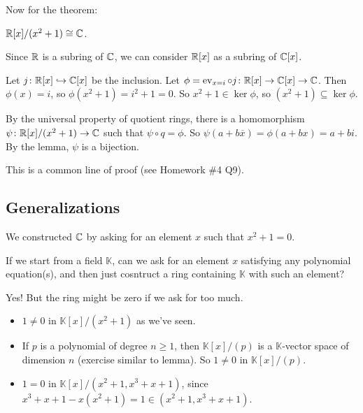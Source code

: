\documentclass[12pt,letterpaper]{report}
\begin{document}
Now for the theorem:

\begin{thm}{}{}
  $\mathbb{R}[x]/(x^2 + 1) \cong \mathbb{C}$.
\end{thm}

\begin{thmproof}
  Since $\mathbb{R}$ is a subring of $\mathbb{C}$, we can consider $\mathbb{R}[x]$ as a subring of $\mathbb{C}[x]$.

  Let $j \colon \mathbb{R}[x] \hookrightarrow \mathbb{C}[x]$ be the inclusion.
  Let $\phi = \operatorname{ev}_{x = i} \circ j \colon \mathbb{R}[x] \to \mathbb{C}[x] \to \mathbb{C}$.
  Then $\phi(x) = i$, so $\phi(x^2 + 1) = i^2 + 1 = 0$.
  So $x^2 + 1 \in \ker\phi$, so $(x^2 + 1) \subseteq \ker\phi$.

  By the universal property of quotient rings, there is a homomorphism
  $\psi \colon \mathbb{R}[x]/(x^2 + 1) \to \mathbb{C}$ such that $\psi \circ q = \phi$.
  So $\psi(a + b\overline{x}) = \phi(a + bx) = a + bi$.
  By the lemma, $\psi$ is a bijection.
\end{thmproof}

This is a common line of proof (see Homework \#4 Q9).

\pagebreak
\subsection{Generalizations}

We constructed $\mathbb{C}$ by asking for an element $x$ such that $x^2 + 1 = 0$.

If we start from a field $\mathbb{K}$, can we ask for an element $x$ satisfying any polynomial
equation(s), and then just cosntruct a ring containing $\mathbb{K}$ with such an element?

Yes!
But the ring might be zero if we ask for too much.

\begin{ex}
  \begin{itemize}
    \item $1 \neq 0$ in $\mathbb{K}[x]/(x^2 + 1)$ as we've seen.
    \item If $p$ is a polynomial of degree $n \geq 1$, then $\mathbb{K}[x]/(p)$ is a
      $\mathbb{K}$-vector space of dimension $n$ (exercise similar to lemma).
      So $1 \neq 0$ in $\mathbb{K}[x]/(p)$.
    \item $1 = 0$ in $\mathbb{K}[x]/(x^2 + 1, x^3 + x + 1)$, since
      $x^3 + x + 1 - x(x^2 + 1) = 1 \in (x^2 + 1, x^3 + x + 1)$.
  \end{itemize}
\end{ex}

\pagebreak
\end{document}
